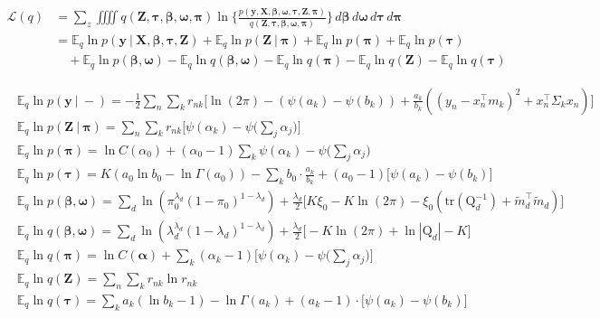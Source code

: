 \documentclass[twoside,11pt]{article}
\newcommand\given[1][]{\:#1\vert\:}
\newcommand{\transpose}[1]{#1^{\intercal}}
\newcommand{\nsum}{\sum\limits_{n}}
\newcommand{\ksum}{\sum\limits_{k}}
\newcommand{\boldbeta}{\boldsymbol\beta}
\newcommand{\boldomega}{\boldsymbol\omega}
\newcommand{\boldtau}{\boldsymbol\tau}
\newcommand{\boldpi}{\boldsymbol\pi}
\newcommand{\E}{\mathbb{E}}
\newcommand{\qmat}{\mathrm{Q}}
\newcommand{\trace}[1]{\mathrm{tr} \left( #1 \right)}
\begin{document}
\begin{equation} \label{eq:ELBO_indep}
\begin{split}
	\mathcal{L}(q) &= \sum_{z} \iiiint q\left(\mathbf{Z}, \boldtau, \boldbeta, \boldsymbol \omega, \boldpi \right)
	\ln \Bigg\{ \frac{p\left(\mathbf{y}, \mathbf{X}, \boldbeta, \boldsymbol\omega, \boldtau, \mathbf{Z}, \boldpi \right)}{q\left(\mathbf{Z}, \boldtau, \boldbeta, \boldsymbol \omega, \boldpi \right)}\Bigg\}\, d\boldbeta\, d\boldsymbol\omega\, d\boldtau\, d\boldpi \\
	&= \E_q \ln p\left( \mathbf{y} \given \mathbf{X}, \boldbeta, \boldtau, \mathbf{Z} \right) + \E_q \ln p\left( \mathbf{Z} \given \boldpi \right) + \E_q \ln p\left( \boldpi \right) + \E_q \ln p\left( \boldtau \right) \\ & \quad + \E_q \ln p\left( \boldbeta, \boldomega \right) - \E_q \ln q\left( \boldbeta, \boldomega \right) - 
	\E_q \ln q\left( \boldpi \right) - \E_q \ln q\left( \mathbf{Z} \right) - \E_q \ln q\left( \mathbf{\tau} \right)
\end{split}
\end{equation}

\begin{align*}
	& \E_q \ln p\left( \mathbf{y} \given - \right) = - \frac{1}{2} \nsum \ksum r_{nk} \bigg[ \ln(2\pi) - (\psi(a_k) - \psi(b_k)) + \frac{a_k}{b_k} \left( (y_n - \transpose{x_n} m_k )^2 + \transpose{x_n} \Sigma_k x_n \right) \bigg] \\
	& \E_q \ln p\left( \mathbf{Z} \given \boldpi\right)  = \nsum \ksum r_{nk} \bigg[ \psi(\alpha_k) - \psi \Big( \sum_j \alpha_j\Big)  \bigg]\\
	& \E_q \ln p\left( \boldpi \right) = \ln C(\alpha_0) + (\alpha_0 - 1) \ksum \psi( \alpha_k) - \psi \Big( \sum_j \alpha_j \Big)  \\
	& \E_q \ln p\left( \boldtau \right) = K \left( a_0 \ln b_0 - \ln \Gamma(a_0) \right) - \ksum b_0 \cdot \frac{a_k}{b_k} + (a_0 - 1) \bigg[ \psi(a_k) - \psi(b_k) \bigg] \\
	& \E_q \ln p\left( \boldbeta, \boldomega \right) = \sum_d \ln \left( \pi_0^{\lambda_d} (1 - \pi_0)^{1 -\lambda_d}\right) + \frac{\lambda_d}{2}  \bigg[ K \xi_0 - K \ln (2 \pi) - \xi_0 \left( \trace{\qmat_d^{-1}} + \transpose{\tilde{m}_d}\tilde{m}_d \right) \bigg] \\
	& \E_q \ln q\left( \boldbeta, \boldomega \right) = \sum_d \ln \left( \lambda_d^{\lambda_d} (1 - \lambda_d)^{1 - \lambda_d} \right) + \frac{\lambda_d}{2} \bigg[ - K \ln (2\pi) + \ln |\qmat_d| - K\bigg]\\
	& \E_q \ln q\left( \boldpi \right) = \ln C(\boldsymbol \alpha ) + \ksum (\alpha_k - 1) \bigg[ \psi(\alpha_k) - \psi\Big( \sum_j \alpha_j \Big) \bigg] \\
	& \E_q \ln q\left( \mathbf{Z} \right) = \nsum \ksum r_{nk} \ln r_{nk} \\
	& \E_q \ln q\left( \boldtau \right) = \ksum a_k \left( \ln b_k - 1 \right) - \ln \Gamma(a_k)  + (a_k - 1) \cdot \bigg[ \psi(a_k) - \psi(b_k) \bigg]
\end{align*}
\end{document}
